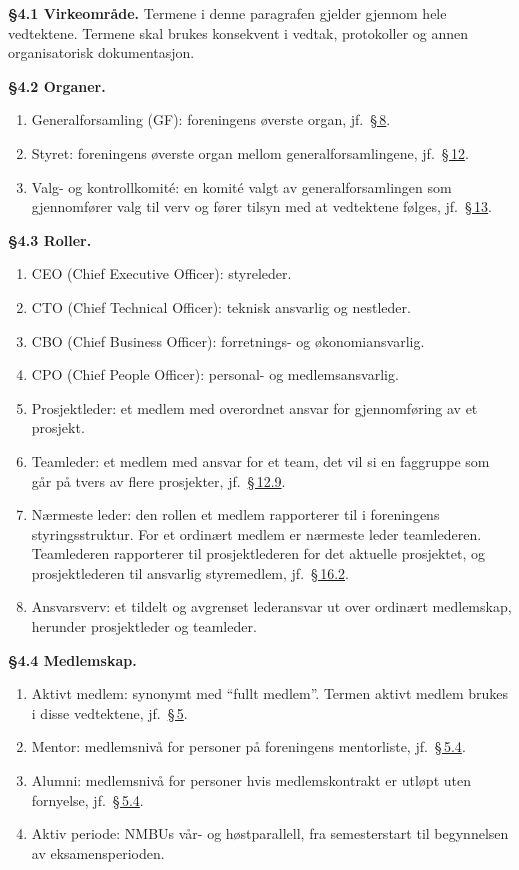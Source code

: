 \documentclass{../../../Common/Latex/Templates/rapport}
\begin{document}
\label{nbylaw:4}
\textbf{\S 4.1 Virkeomr\r{a}de.}\label{nbylaw:4.1} Termene i denne paragrafen gjelder gjennom hele vedtektene. Termene skal brukes konsekvent i vedtak, protokoller og annen organisatorisk dokumentasjon.

\textbf{\S 4.2 Organer.}\label{nbylaw:4.2}
\begin{enumerate}
  \item Generalforsamling (GF): foreningens øverste organ, jf.\ \hyperref[nbylaw:8]{\S\,8}.
  \item Styret: foreningens øverste organ mellom generalforsamlingene, jf.\ \hyperref[nbylaw:12]{\S\,12}.
  \item Valg- og kontrollkomit\'e: en komit\'e valgt av generalforsamlingen som gjennomfører valg til verv og fører tilsyn med at vedtektene følges, jf.\ \hyperref[nbylaw:13]{\S\,13}.
\end{enumerate}

\textbf{\S 4.3 Roller.}\label{nbylaw:4.3}
\begin{enumerate}
  \item CEO (Chief Executive Officer): styreleder.
  \item CTO (Chief Technical Officer): teknisk ansvarlig og nestleder.
  \item CBO (Chief Business Officer): forretnings- og økonomiansvarlig.
  \item CPO (Chief People Officer): personal- og medlemsansvarlig.
  \item Prosjektleder: et medlem med overordnet ansvar for gjennomføring av et prosjekt.
  \item Teamleder: et medlem med ansvar for et team, det vil si en faggruppe som g\r{a}r p\r{a} tvers av flere prosjekter, jf.\ \hyperref[nbylaw:12.9]{\S\,12.9}.
  \item Nærmeste leder: den rollen et medlem rapporterer til i foreningens styringsstruktur. For et ordinært medlem er nærmeste leder teamlederen. Teamlederen rapporterer til prosjektlederen for det aktuelle prosjektet, og prosjektlederen til ansvarlig styremedlem, jf.\ \hyperref[nbylaw:16.2]{\S\,16.2}.
  \item Ansvarsverv: et tildelt og avgrenset lederansvar ut over ordinært medlemskap, herunder prosjektleder og teamleder.
\end{enumerate}

\textbf{\S 4.4 Medlemskap.}\label{nbylaw:4.4}
\begin{enumerate}
  \item Aktivt medlem: synonymt med ``fullt medlem''. Termen aktivt medlem brukes i disse vedtektene, jf.\ \hyperref[nbylaw:5]{\S\,5}.
  \item Mentor: medlemsniv\r{a} for personer p\r{a} foreningens mentorliste, jf.\ \hyperref[nbylaw:5.4]{\S\,5.4}.
  \item Alumni: medlemsniv\r{a} for personer hvis medlemskontrakt er utløpt uten fornyelse, jf.\ \hyperref[nbylaw:5.4]{\S\,5.4}.
  \item Aktiv periode: NMBUs v\r{a}r- og høstparallell, fra semesterstart til begynnelsen av eksamensperioden.
\end{enumerate}
\end{document}
